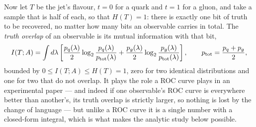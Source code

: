Now let \(T\) be the jet's flavour, \(t=0\) for a quark and \(t=1\) for a gluon, and
take a sample that is half of each, so that \(H(T)=1\): there is exactly one bit of
truth to be recovered, no matter how many bits an observable carries in total. The
\emph{truth overlap} of an observable is its mutual information with that bit,
\begin{equation}
	I(T;A) = \int d\lambda\left[
	\frac{p_q(\lambda)}{2}\log_2\frac{p_q(\lambda)}{p_{\rm tot}(\lambda)}
	+ \frac{p_g(\lambda)}{2}\log_2\frac{p_g(\lambda)}{p_{\rm tot}(\lambda)}\right] ,
	\qquad
	p_{\rm tot} = \frac{p_q+p_g}{2} ,
	\label{eq:qgmiTruthOverlap}
\end{equation}
bounded by \(0\le I(T;A)\le H(T)=1\), zero for two identical distributions and one
for two that do not overlap. It plays the role a ROC curve plays in an experimental
paper --- and indeed if one observable's ROC curve is everywhere better than
another's, its truth overlap is strictly larger, so nothing is lost by the change of
language --- but unlike a ROC curve it is a single number with a closed-form
integral, which is what makes the analytic study below possible.

